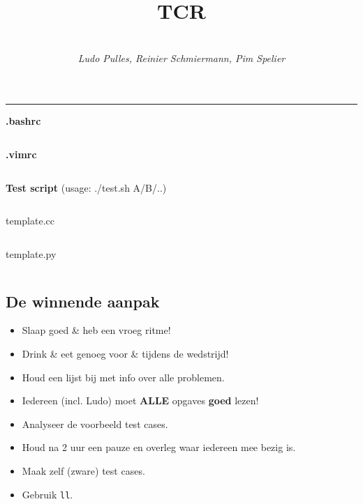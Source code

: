 \documentclass[8pt,a4paper,landscape,oneside]{amsart}
\title{TCR}
\subtitle{\textbf{\QQ} \\ \textit{Ludo Pulles, Reinier Schmiermann, Pim Spelier}}
\newcommand{\mintedstyle}[2]{\inputminted[fontsize=\normalsize,baselinestretch=.9,breaklines,tabsize=2]{#1}{code/#2}}
\newcommand{\code}[1]{\mintedstyle{cpp}{#1}}
\newenvironment{myitemize}
{\begin{itemize}[leftmargin=.3cm]
	\setlength{\itemsep}{0pt}
	\setlength{\parskip}{0pt}
	\setlength{\parsep}{0pt}     }
{ \end{itemize}                  }
\begin{document}
\begin{multicols*}{3}
\maketitle
\begin{comment}
\begin{center}
	\makeatletter
	\textbf{\@title} \\
	\emph{\@author}
	\makeatother
\end{center}
\end{comment}


\tableofcontents

\begin{center}
\noindent\rule{\columnwidth}{0.4pt}
\end{center}

\begin{center}
\textbf{.bashrc}
\end{center}
\mintedstyle{bash}{.bashrc}

\begin{center}
\textbf{.vimrc}
\end{center}
\mintedstyle{vim}{.vimrc}

\textbf{Test script} (usage: ./test.sh A/B/..)
\mintedstyle{bash}{test.sh}

\begin{center}
template.cc
\end{center}

\code{T.cpp}

\begin{center}
template.py
\end{center}

\mintedstyle{python}{python.py}

\subsection{De winnende aanpak}

\begin{myitemize}
	\item Slaap goed \& heb een vroeg ritme!
	\item Drink \& eet genoeg voor \& tijdens de wedstrijd!
	\item Houd een lijst bij met info over alle problemen.
	\item Iedereen (incl. Ludo) moet {\huge\textbf{ALLE}} opgaves \textbf{goed} lezen!
	\item Analyseer de voorbeeld test cases.
	\item Houd na 2 uur een pauze en overleg waar iedereen mee bezig is.
	\item Maak zelf (zware) test cases.
	\item Gebruik \texttt{ll}.
\end{myitemize}


\end{multicols*}
\end{document}
